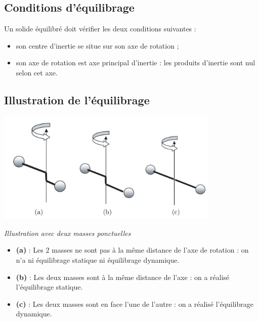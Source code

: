 \documentclass[10pt,fleqn]{article} %
\begin{document}
\subsection{Conditions d'équilibrage}

\begin{defi}
Un solide équilibré doit vérifier les deux conditions suivantes :
\begin{itemize}
\item son centre d'inertie se situe sur son axe de rotation ; 
\item son axe de rotation est axe principal d'inertie : les produits d'inertie sont nul selon cet axe.
\end{itemize}
\end{defi}

\subsection{Illustration de l'équilibrage}


  \begin{center}
  \includegraphics[width=0.8\textwidth]{images/illustration_equilibrage.png}
  
  \textit{Illustration avec deux masses ponctuelles}
  \end{center}

\begin{itemize}
\item \textbf{(a)} : Les 2 masses ne sont pas à la même distance de l'axe de rotation : on n'a ni équilibrage statique ni équilibrage dynamique.
\item \textbf{(b)} : Les deux masses sont à la même distance de l'axe : on a réalisé l'équilibrage statique.
\item \textbf{(c)} : Les deux masses sont en face l'une de l'autre : on a réalisé l'équilibrage dynamique.
\end{itemize}
\end{document}
